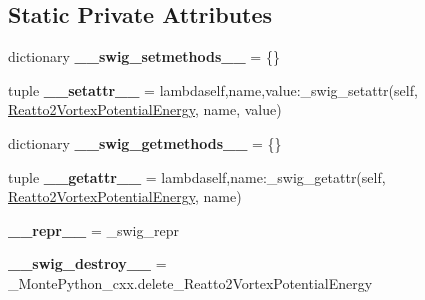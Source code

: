 \subsection*{Static Private Attributes}
\begin{DoxyCompactItemize}
\item 
\hypertarget{classMontePython__cxx_1_1Reatto2VortexPotentialEnergy_a65d31f1fda62ac14f9935477a0244272}{}dictionary {\bfseries \+\_\+\+\_\+swig\+\_\+setmethods\+\_\+\+\_\+} = \{\}\label{classMontePython__cxx_1_1Reatto2VortexPotentialEnergy_a65d31f1fda62ac14f9935477a0244272}

\item 
\hypertarget{classMontePython__cxx_1_1Reatto2VortexPotentialEnergy_aab3bee300a82806f1020a86044774223}{}tuple {\bfseries \+\_\+\+\_\+setattr\+\_\+\+\_\+} = lambdaself,name,value\+:\+\_\+swig\+\_\+setattr(self, \hyperlink{classMontePython__cxx_1_1Reatto2VortexPotentialEnergy}{Reatto2\+Vortex\+Potential\+Energy}, name, value)\label{classMontePython__cxx_1_1Reatto2VortexPotentialEnergy_aab3bee300a82806f1020a86044774223}

\item 
\hypertarget{classMontePython__cxx_1_1Reatto2VortexPotentialEnergy_a0c1bc29589928bb087bcd302fcd0856a}{}dictionary {\bfseries \+\_\+\+\_\+swig\+\_\+getmethods\+\_\+\+\_\+} = \{\}\label{classMontePython__cxx_1_1Reatto2VortexPotentialEnergy_a0c1bc29589928bb087bcd302fcd0856a}

\item 
\hypertarget{classMontePython__cxx_1_1Reatto2VortexPotentialEnergy_afe8c9c0370110fbbbbd0e1ae836ef267}{}tuple {\bfseries \+\_\+\+\_\+getattr\+\_\+\+\_\+} = lambdaself,name\+:\+\_\+swig\+\_\+getattr(self, \hyperlink{classMontePython__cxx_1_1Reatto2VortexPotentialEnergy}{Reatto2\+Vortex\+Potential\+Energy}, name)\label{classMontePython__cxx_1_1Reatto2VortexPotentialEnergy_afe8c9c0370110fbbbbd0e1ae836ef267}

\item 
\hypertarget{classMontePython__cxx_1_1Reatto2VortexPotentialEnergy_a03430f30d4ae34ec2d8cd2a697fb04cf}{}{\bfseries \+\_\+\+\_\+repr\+\_\+\+\_\+} = \+\_\+swig\+\_\+repr\label{classMontePython__cxx_1_1Reatto2VortexPotentialEnergy_a03430f30d4ae34ec2d8cd2a697fb04cf}

\item 
\hypertarget{classMontePython__cxx_1_1Reatto2VortexPotentialEnergy_a154e9deece8c325c6b7c4fe8f1e2f63f}{}{\bfseries \+\_\+\+\_\+swig\+\_\+destroy\+\_\+\+\_\+} = \+\_\+\+Monte\+Python\+\_\+cxx.\+delete\+\_\+\+Reatto2\+Vortex\+Potential\+Energy\label{classMontePython__cxx_1_1Reatto2VortexPotentialEnergy_a154e9deece8c325c6b7c4fe8f1e2f63f}

\end{DoxyCompactItemize}


